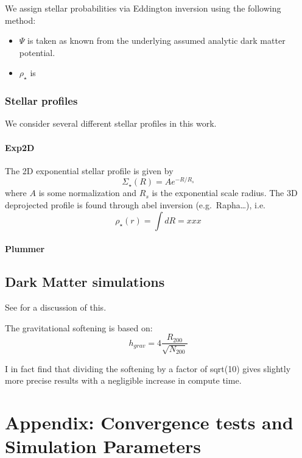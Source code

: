 We assign stellar probabilities via Eddington inversion using the
following method:

\begin{itemize}
\tightlist
\item
  \(\Psi\) is taken as known from the underlying assumed analytic dark
  matter potential.
\item
  \(\rho_\star\) is
\end{itemize}

\subsubsection{Stellar profiles}\label{stellar-profiles}

We consider several different stellar profiles in this work.

\paragraph{Exp2D}\label{exp2d}

The 2D exponential stellar profile is given by \[
\Sigma_\star(R) = A e^{-R / R_s}
\] where \(A\) is some normalization and \(R_s\) is the exponential
scale radius. The 3D deprojected profile is found through abel inversion
(e.g.~Rapha\ldots), i.e. \[
\rho_\star (r) = \int dR = xxx
\]

\paragraph{Plummer}\label{plummer}

\subsection{Dark Matter simulations}\label{dark-matter-simulations}

See \citet{power+2003} for a discussion of this.

The gravitational softening is based on: \[
h_{grav} = 4 \frac{R_{200}}{\sqrt{N_{200}}}
\]

I in fact find that dividing the softening by a factor of sqrt(10) gives
slightly more precise results with a negligible increase in compute
time.

\section{Appendix: Convergence tests and Simulation
Parameters}\label{appendix-convergence-tests-and-simulation-parameters}


